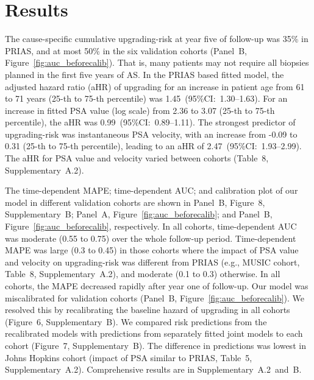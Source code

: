 \section{Results}
The cause-specific cumulative upgrading-risk at year five of follow-up was 35\% in PRIAS, and at most 50\% in the six validation cohorts (Panel~B, Figure~\ref{fig:auc_beforecalib}). That is, many patients may not require all biopsies planned in the first five years of AS. In the PRIAS based fitted model, the adjusted hazard ratio (aHR) of upgrading for an increase in patient age from 61 to 71 years (25-th to 75-th percentile) was 1.45~(95\%CI:~1.30--1.63). For an increase in fitted PSA value (log scale) from 2.36 to 3.07 (25-th to 75-th percentile), the aHR was 0.99~(95\%CI:~0.89--1.11). The strongest predictor of upgrading-risk was instantaneous PSA velocity, with an increase from -0.09 to 0.31 (25-th to 75-th percentile), leading to an aHR of 2.47~(95\%CI:~1.93--2.99). The aHR for PSA value and velocity varied between cohorts (Table~8, Supplementary~A.2).

The time-dependent MAPE; time-dependent AUC; and calibration plot of our model in different validation cohorts are shown in Panel~B, Figure~8, Supplementary~B; Panel~A, Figure~\ref{fig:auc_beforecalib}; and Panel~B, Figure~\ref{fig:auc_beforecalib}, respectively. In all cohorts, time-dependent AUC was moderate (0.55 to 0.75) over the whole follow-up period. Time-dependent MAPE was large (0.3 to 0.45) in those cohorts where the impact of PSA value and velocity on upgrading-risk was different from PRIAS (e.g., MUSIC cohort, Table~8, Supplementary~A.2), and moderate (0.1 to 0.3) otherwise. In all cohorts, the MAPE decreased rapidly after year one of follow-up. Our model was miscalibrated for validation cohorts (Panel~B, Figure~\ref{fig:auc_beforecalib}). We resolved this by recalibrating the baseline hazard of upgrading in all cohorts (Figure~6, Supplementary~B). We compared risk predictions from the recalibrated models with predictions from separately fitted joint models to each cohort (Figure~7, Supplementary~B). The difference in predictions was lowest in Johns Hopkins cohort (impact of PSA similar to PRIAS, Table~5, Supplementary~A.2). Comprehensive results are in Supplementary~A.2~and~B.

